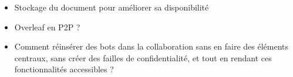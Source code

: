 \begin{itemize}
    \item Stockage du document pour améliorer sa disponibilité
    \item Overleaf en P2P ?
    \item Comment réinsérer des bots dans la collaboration sans en faire des éléments centraux, sans créer des failles de confidentialité, et tout en rendant ces fonctionnalités accessibles ?
  \end{itemize}
